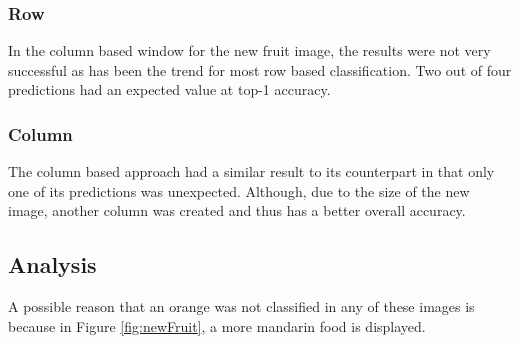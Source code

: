 \tocless\subsubsection{Row}
In the column based window for the new fruit image, the results were not very
successful as has been the trend for most row based classification. Two out of
four predictions had an expected value at top-1 accuracy.

\tocless\subsubsection{Column}
The column based approach had a similar result to its counterpart in that only
one of its predictions was unexpected. Although, due  to the size of the new
image, another column was created and thus has a better overall accuracy.

\tocless\subsection{Analysis}
A possible reason that an orange was not classified in any of these images is
because in Figure \ref{fig:newFruit}, a more mandarin food is displayed.
